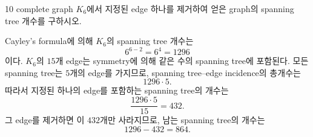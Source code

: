 \begin{problem}{10}
complete graph $K_6$에서 지정된 edge 하나를 제거하여 얻은 graph의 spanning tree 개수를 구하시오.
\end{problem}

\begin{solution}
Cayley's formula에 의해 $K_6$의 spanning tree 개수는
\[
    6^{6-2}=6^4=1296
\]
이다. $K_6$의 $15$개 edge는 symmetry에 의해 같은 수의 spanning tree에 포함된다. 모든 spanning tree는 $5$개의 edge를 가지므로, spanning tree--edge incidence의 총개수는
\[
    1296\cdot5.
\]
따라서 지정된 하나의 edge를 포함하는 spanning tree의 개수는
\[
    \frac{1296\cdot5}{15}=432.
\]
그 edge를 제거하면 이 $432$개만 사라지므로, 남는 spanning tree의 개수는
\[
    1296-432
    =
    \boxed{864}.
\]
\end{solution}

